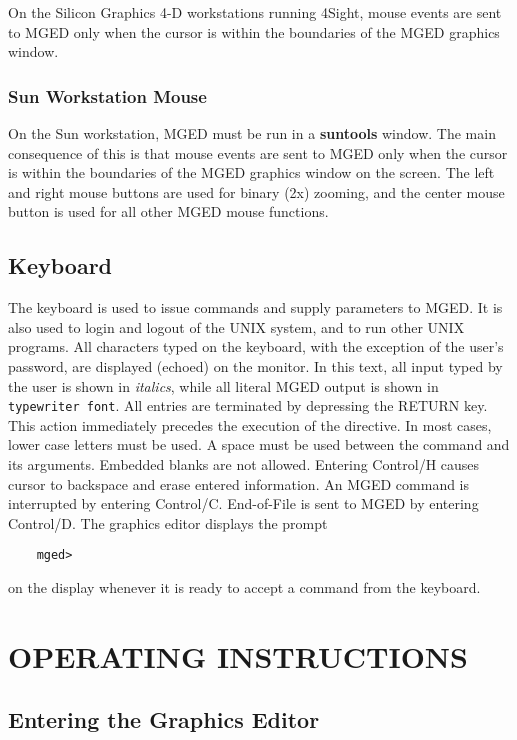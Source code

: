 On the Silicon Graphics 4-D workstations running 4Sight,
mouse events are sent to MGED only when the cursor is within the
boundaries of the MGED graphics window.

\subsection{Sun Workstation Mouse}

On the Sun workstation, MGED must be run in a {\bf suntools} window.
The main consequence of this is that mouse events are sent to MGED
only when the cursor is within the boundaries of the MGED graphics window
on the screen.
The left and right mouse buttons are used for binary (2x) zooming,
and the center mouse button is used for all other MGED mouse functions.

\section{Keyboard}

The keyboard is used to issue commands and supply parameters to MGED.
It is also used to login and logout of the UNIX system, and to
run other UNIX programs.
All characters typed on the keyboard,
with the exception of the user's password, are displayed (echoed) on the
monitor.
In this text, all input typed by the user is
shown in {\em italics}, while all literal MGED output
is shown in {\tt typewriter font}.
All entries are
terminated by depressing the RETURN key.
This action immediately precedes the execution of the directive.
In most cases, lower case letters
must be used.  A space must be used between the command and its
arguments.
Embedded blanks are not allowed.
Entering Control/H causes cursor to backspace and erase entered
information.
An MGED command is interrupted by entering Control/C.
End-of-File is sent to MGED by entering Control/D.
The graphics editor displays the prompt
\begin{verbatim}
	mged>
\end{verbatim}
on the display whenever it is ready to accept a command from the keyboard.

\chapter{OPERATING INSTRUCTIONS}

\section{Entering the Graphics Editor}

